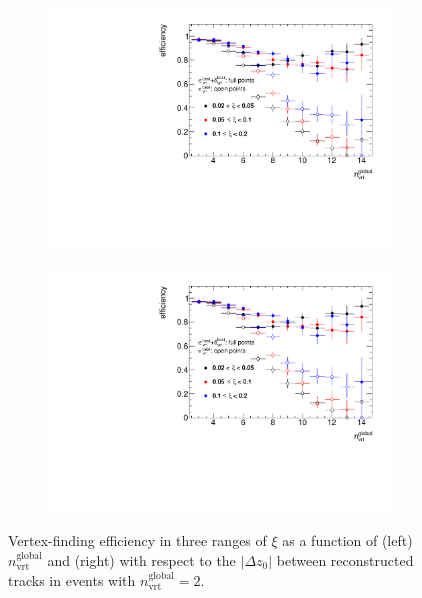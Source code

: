 \begin{figure}[b!]
	\vspace{-0.4cm}
	\centering
	\begin{subfigure}{.49\textwidth}
		\includegraphics[width=1.0\textwidth,page=1]{chapters/chrgSTAR/img/vertex/vertexEffi_ksi.pdf}
	\end{subfigure}
	\begin{subfigure}{.49\textwidth}
		\includegraphics[width=1.0\textwidth,page=8]{chapters/chrgSTAR/img/vertex/vertexEffi_ksi.pdf}
	\end{subfigure}
	
	\vspace{-0.3cm}
	\caption{Vertex-finding efficiency in three ranges of $\xi$ as a function of  (left) $n^\textrm{global}_\textrm{vrt}$ and (right) with respect to the $|\Delta z_0|$ between reconstructed tracks in events with $n^\textrm{global}_\textrm{vrt}=2$. }
	\label{fig:vertexEffi}
\end{figure}

